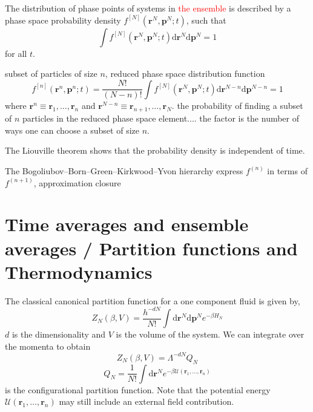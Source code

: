 The distribution of phase points of systems in \textcolor{red}{the
ensemble} is described by a phase space probability density $f^{[N]}(\mathbf{r}^{N},\mathbf{p}^{N};t)$,
such that 
\begin{equation}
\int f^{[N]}(\mathbf{r}^{N},\mathbf{p}^{N};t)\mathrm{d}\mathbf{r}^{N}\mathrm{d}\mathbf{p}^{N}=1
\end{equation}
for all $t$.

subset of particles of size $n$, reduced phase space distribution
function 
\begin{equation}
f^{[n]}(\mathbf{r}^{n},\mathbf{p}^{n};t)=\dfrac{N!}{(N-n)!}\int f^{[N]}(\mathbf{r}^{N},\mathbf{p}^{N};t)\mathrm{d}\mathbf{r}^{N-n}\mathrm{d}\mathbf{p}^{N-n}=1
\end{equation}
where $\mathbf{r}^{n}\equiv\mathbf{r}_{1},\ldots,\mathbf{r}_{n}$
and $\mathbf{r}^{N-n}\equiv\mathbf{r}_{n+1},\ldots,\mathbf{r}_{N}$.
the probability of finding a subset of $n$ particles in the reduced
phase space element.... the factor is the number of ways one can choose
a subset of size $n$.

The Liouville theorem shows that the probability density is independent
of time.

The Bogoliubov–Born–Green–Kirkwood–Yvon hierarchy express $f^{(n)}$
in terms of $f^{(n+1)}$, approximation closure


\section{Time averages and ensemble averages / Partition functions and Thermodynamics}

The classical canonical partition function for a one component fluid
is given by,
\begin{equation}
Z_{N}(\beta,V)=\dfrac{h^{-dN}}{N!}\int\mathrm{d}\mathbf{r}^{N}\mathrm{d}\mathbf{p}^{N}e^{-\beta H_{N}}
\end{equation}
$d$ is the dimensionality and $V$ is the volume of the system. We
can integrate over the momenta to obtain
\begin{equation}
Z_{N}(\beta,V)=\Lambda^{-dN}Q_{N}
\end{equation}
\begin{equation}
Q_{N}=\dfrac{1}{N!}\int\mathrm{d}\mathbf{r}^{N}e^{-\beta\mathcal{U}(\mathbf{r}_{1},\ldots,\mathbf{r}_{n})}
\end{equation}
is the configurational partition function. Note that the potential
energy $\mathcal{U}(\mathbf{r}_{1},\ldots,\mathbf{r}_{n})$ may still
include an external field contribution.

